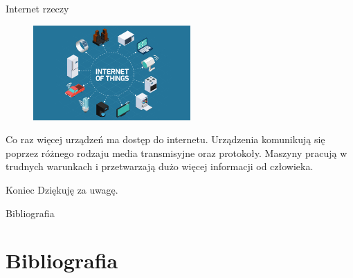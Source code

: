 \documentclass{beamer}
\begin{document}
	\begin{frame}{Internet rzeczy}
		\begin{figure}
			\includegraphics[width=6cm]{iot.jpg}
		\end{figure} Co raz więcej urządzeń ma dostęp do internetu. Urządzenia komunikują się poprzez różnego rodzaju media transmisyjne oraz protokoły. Maszyny pracują w trudnych warunkach i przetwarzają dużo więcej informacji od człowieka. 
	\end{frame}
	\begin{frame}{Koniec}
		\centering Dziękuję za uwagę.
	\end{frame}
	\begin{frame}{Bibliografia}
	\section{Bibliografia}
	
	\end{frame}
\end{document}
